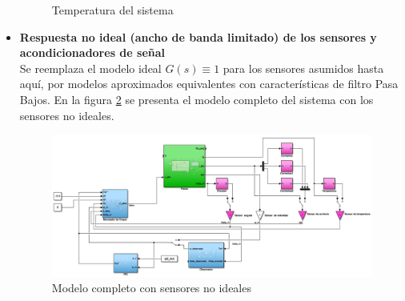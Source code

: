 \documentclass[10pt]{article}
\begin{document}
\begin{itemize}
\begin{figure}[h!]
		\caption{\label{fig:temp}Temperatura del sistema}
		\end{figure}
\newpage
\item \textbf{Respuesta no ideal (ancho de banda limitado) de los sensores y acondicionadores de señal}\\
Se reemplaza el modelo ideal $G(s)\equiv 1$ para los sensores asumidos hasta aquí, por modelos aproximados equivalentes con características de filtro Pasa Bajos. En la figura \ref{fig:modelocompleto} se presenta el modelo completo del sistema con los sensores no ideales.\\

 \begin{figure}[h!]
	\centering
	\includegraphics[width=\textwidth]{modelocompleto.png}
	\caption{\label{fig:modelocompleto} Modelo completo con sensores no ideales}
	\end{figure}
	

\end{itemize}
\end{document}

